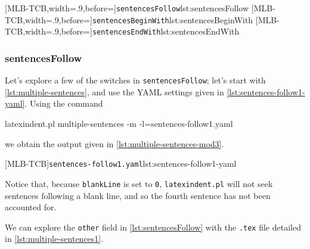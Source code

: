 	\begin{cmhtcbraster}[raster columns=3,
			raster left skip=-3.5cm,
			raster right skip=-2cm,
			raster column skip=.06\linewidth]
		[MLB-TCB,width=.9\linewidth,before=\centering]{\texttt{sentencesFollow}}{lst:sentencesFollow}
		[MLB-TCB,width=.9\linewidth,before=\centering]{\texttt{sentencesBeginWith}}{lst:sentencesBeginWith}
		[MLB-TCB,width=.9\linewidth,before=\centering]{\texttt{sentencesEndWith}}{lst:sentencesEndWith}
	\end{cmhtcbraster}

\subsubsection{sentencesFollow}
	Let's explore a few of the switches in \texttt{sentencesFollow}; let's start with
	\vref{lst:multiple-sentences}, and use the YAML settings given in
	\cref{lst:sentences-follow1-yaml}. Using the command 
	 
	\begin{commandshell}
latexindent.pl multiple-sentences -m -l=sentences-follow1.yaml
\end{commandshell}
	we obtain the output given in \cref{lst:multiple-sentences-mod3}.

	\begin{cmhtcbraster}
		[MLB-TCB]{\texttt{sentences-follow1.yaml}}{lst:sentences-follow1-yaml}
	\end{cmhtcbraster}

	Notice that, because \texttt{blankLine} is set to \texttt{0}, \texttt{latexindent.pl}
	will not seek sentences following a blank line, and so the fourth sentence has not been
	accounted for.

	We can explore the \texttt{other} field in \cref{lst:sentencesFollow} with the
	\texttt{.tex} file detailed in \cref{lst:multiple-sentences1}.


